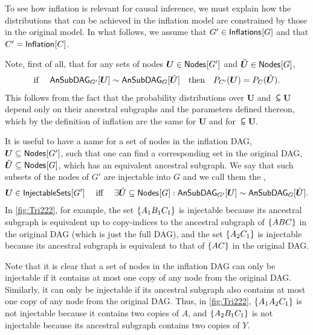 

To see how inflation is relevant for causal inference, we must explain how the distributions that can be achieved in the inflation model are constrained by those in the original model.  In what follows, we assume that $G' \in \SmallNamedFunction{Inflations}{G}$ and that $C' = \SmallNamedFunction{Inflation}{C}$.

Note, first of all, that for any sets of nodes $\bm{U}\in \SmallNamedFunction{Nodes}{G'}$ and   $\subsim{\bm{U}}\in \SmallNamedFunction{Nodes}{G}$,
\begin{align}\label{eq:coincidingdistrodef}
\text{if }\quad \ansubgraph[G']{\bm{U}}\sim\ansubgraph[G]{\subsim{\bm{U}}}\quad\text{then}\quad \pdf[C']{\bm{U}}=\pdf[C]{\subsim{\bm{U}}}.
\end{align}
This follows from the fact that the probability distributions over $\bm{U}$ and $\subsim{\bm{U}}$ depend only on their ancestral subgraphs and the parameters defined thereon, which by the definition of inflation are the same for $\bm{U}$ and for $\subsim{\bm{U}}$.

It is useful to have a name for a set of nodes in the inflation DAG, $\bm{U} \subseteq \SmallNamedFunction{Nodes}{G'}$, such that one can find a corresponding set in the original DAG, $\subsim{\bm{U}} \subseteq \SmallNamedFunction{Nodes}{G}$, which has an equivalent ancestral subgraph.   We say that such subsets of the nodes of $G'$ are injectable into $G$ and we call them the ,
\begin{align}\label{eq:definjectable}
\bm{U}\in\SmallNamedFunction{InjectableSets}{G'} \quad\text{ iff }\quad \exists \subsim{\bm{U}}\subseteq \SmallNamedFunction{Nodes}{G}: \ansubgraph[G']{\bm{U}}\sim\ansubgraph[G]{\subsim{\bm{U}}}.
\end{align}
In \cref{fig:Tri222}, for example, the set $\brackets{A_1 B_1 C_1}$ is injectable because its ancestral subgraph is equivalent up to copy-indices to the ancestral subgraph of $\brackets{A B C}$ in the original DAG (which is just the full DAG), and the set $\brackets{A_2 C_1}$ is injectable because its ancestral subgraph is equivalent to that of $\brackets{ A C}$ in the original DAG. 

Note that it is clear that a set of nodes in the inflation DAG can only be injectable if it contains at most one copy of any node from the original DAG.  Similarly, it can only be injectable if its ancestral subgraph also contains at most one copy of any node from the original DAG.  
Thus, in \cref{fig:Tri222}, $\brackets{A_1 A_2 C_1}$ is not injectable because it contains two copies of $A$, and $\brackets{A_2 B_1 C_1}$ is not injectable because its ancestral subgraph contains two copies of $Y$. 

